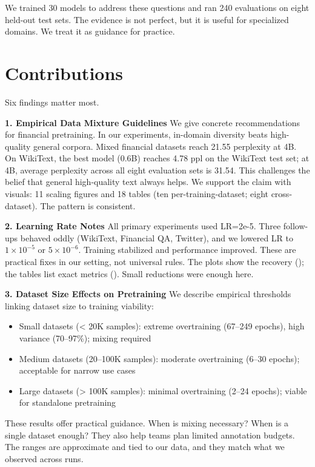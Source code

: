 We trained 30 models to address these questions and ran 240 evaluations on eight held-out test sets. The evidence is not perfect, but it is useful for specialized domains. We treat it as guidance for practice.

\section{Contributions}

Six findings matter most.

\textbf{1. Empirical Data Mixture Guidelines}
We give concrete recommendations for financial pretraining. In our experiments, in-domain diversity beats high-quality general corpora. Mixed financial datasets reach 21.55 perplexity at 4B. On WikiText, the best model (0.6B) reaches 4.78 ppl on the WikiText test set; at 4B, average perplexity across all eight evaluation sets is 31.54. This challenges the belief that general high-quality text always helps. We support the claim with visuals: 11 scaling figures and 18 tables (ten per-training-dataset; eight cross-dataset). The pattern is consistent.

\textbf{2. Learning Rate Notes}
All primary experiments used LR=2e-5. Three follow-ups behaved oddly (WikiText, Financial QA, Twitter), and we lowered LR to $1\times10^{-5}$ or $5\times10^{-6}$. Training stabilized and performance improved. These are practical fixes in our setting, not universal rules. The plots show the recovery (); the tables list exact metrics (). Small reductions were enough here.

\textbf{3. Dataset Size Effects on Pretraining}
We describe empirical thresholds linking dataset size to training viability:
\begin{itemize}
    \item Small datasets (< 20K samples): extreme overtraining (67--249 epochs), high variance (70--97\%); mixing required
    \item Medium datasets (20--100K samples): moderate overtraining (6--30 epochs); acceptable for narrow use cases
    \item Large datasets (> 100K samples): minimal overtraining (2--24 epochs); viable for standalone pretraining
\end{itemize}
These results offer practical guidance. When is mixing necessary? When is a single dataset enough? They also help teams plan limited annotation budgets. The ranges are approximate and tied to our data, and they match what we observed across runs.


